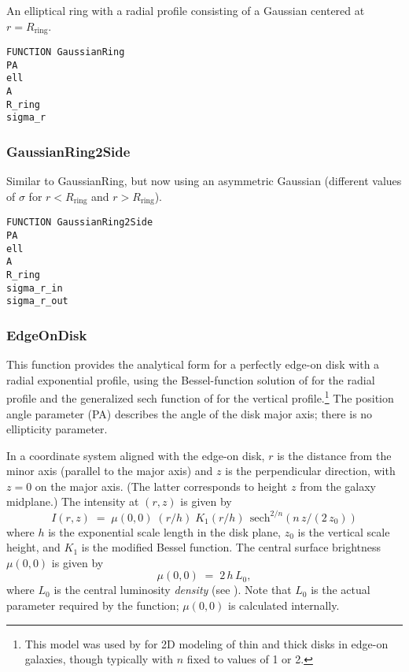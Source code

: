 \documentclass[10pt,a4paper,article]{memoir}
\begin{document}
An elliptical ring with a radial profile consisting of a Gaussian
centered at $r = R_{\mathrm{ring}}$.

\begin{verbatim}
FUNCTION GaussianRing
PA
ell
A
R_ring
sigma_r
\end{verbatim}


\subsubsection{GaussianRing2Side}

Similar to GaussianRing, but now using an asymmetric Gaussian (different
values of $\sigma$ for $r < R_{\mathrm{ring}}$ and $r > R_{\mathrm{ring}}$).

\begin{verbatim}
FUNCTION GaussianRing2Side
PA
ell
A
R_ring
sigma_r_in
sigma_r_out
\end{verbatim}


\subsubsection{EdgeOnDisk}

This function provides the analytical form for a perfectly edge-on disk with a
radial exponential profile, using the Bessel-function solution of \citet{vdk81}
for the radial profile and the generalized sech function of \citet{vdk88} for
the vertical profile.\footnote{This model was used by \citet{yoachim06} for 2D
modeling of thin and thick disks in edge-on galaxies, though typically with $n$
fixed to values of 1 or 2.} The position angle parameter (PA) describes the
angle of the disk major axis; there is no ellipticity parameter.

In a coordinate system aligned with the edge-on disk, $r$ is the distance from the minor
axis (parallel to the major axis) and $z$ is the perpendicular direction, with $z = 0$
on the major axis. (The latter corresponds to height $z$ from the galaxy midplane.) The 
intensity at $(r,z)$ is given by
\begin{equation}
I(r,z) \; = \; \mu(0,0) \; (r/h) \; K_{1}(r/h) \;\, {\mathrm{sech}}^{2/n} (n \, z/(2 \, z_{0}))
\end{equation}
where $h$ is the exponential scale length in the disk plane, $z_{0}$ is the vertical
scale height, and $K_{1}$ is the modified Bessel function. The central surface brightness 
$\mu(0,0)$ is given by
\begin{equation}
\mu(0,0) \; = \;  2 \, h \, L_{0},
\end{equation}
where $L_{0}$ is the central luminosity \textit{density} (see \citealt{vdk81}). Note that 
$L_{0}$ is the actual parameter required by the function; $\mu(0,0)$ is calculated 
internally.
\end{document}
